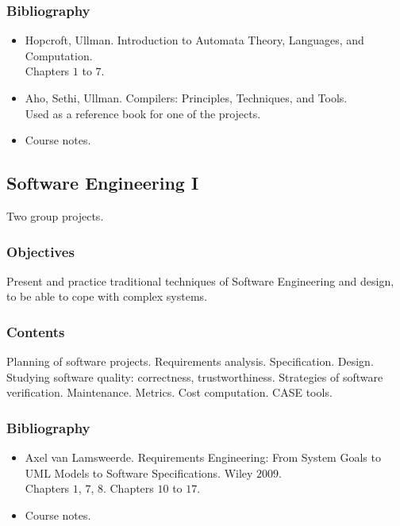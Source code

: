 \documentclass[spanish]{article}
\begin{document}
\subsubsection{Bibliography}
\begin{itemize}
  \item Hopcroft, Ullman. Introduction to Automata Theory, Languages, and
    Computation.\\
    Chapters $1$ to $7$.
  \item Aho, Sethi, Ullman. Compilers: Principles, Techniques, and Tools.\\
    Used as a reference book for one of the projects.
  \item Course notes.
\end{itemize}


\hrulefill%

\subsection{Software Engineering I}
Two group projects.

\subsubsection{Objectives}
Present and practice traditional techniques of Software Engineering and
design, to be able to cope with complex systems.

\subsubsection{Contents}
Planning of software projects. Requirements analysis. Specification.
Design. Studying software quality: correctness, trustworthiness.
Strategies of software verification. Maintenance. Metrics. Cost computation.
CASE tools.

\subsubsection{Bibliography}
\begin{itemize}
  \item Axel van Lamsweerde. Requirements Engineering: From System Goals to UML Models to
    Software Specifications. Wiley $2009$.\\
    Chapters $1$, $7$, $8$. Chapters $10$ to $17$.
  \item Course notes.
\end{itemize}
\end{document}
